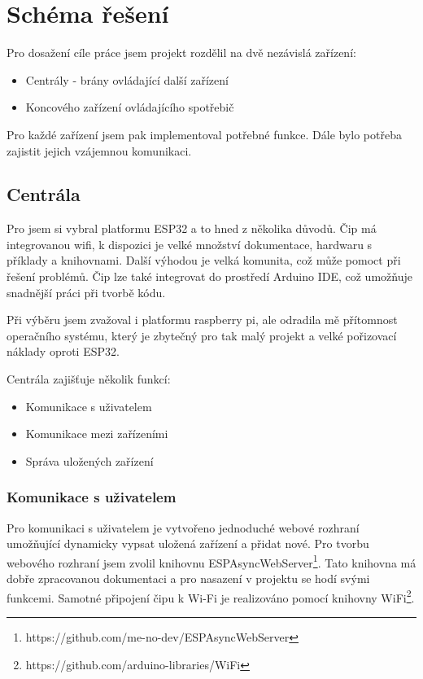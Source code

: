\documentclass[11pt,a4paper,twoside,openright]{report}
\begin{document}
\section{Schéma řešení}

Pro dosažení cíle práce jsem projekt rozdělil na dvě nezávislá zařízení:

\begin{itemize}
	\item Centrály - brány ovládající další zařízení
	\item Koncového zařízení ovládajícího spotřebič
\end{itemize}

Pro každé zařízení jsem pak implementoval potřebné funkce. Dále bylo potřeba zajistit jejich vzájemnou komunikaci.

\subsection{Centrála}

Pro  jsem  si vybral platformu ESP32 a to hned z několika důvodů. Čip má integrovanou wifi, k dispozici je velké množství dokumentace, hardwaru s příklady a knihovnami. Další výhodou je velká komunita, což může pomoct při řešení problémů. Čip lze také integrovat do prostředí Arduino IDE, což umožňuje snadnější práci při tvorbě kódu.


Při výběru jsem zvažoval i platformu raspberry pi, ale odradila mě přítomnost operačního systému, který je zbytečný pro tak malý projekt a velké pořizovací náklady oproti ESP32.

Centrála zajišťuje několik funkcí:
\begin{itemize}
	\item Komunikace s uživatelem
	\item Komunikace mezi zařízeními
	\item Správa uložených zařízení
\end{itemize}

\subsubsection{Komunikace s uživatelem}

Pro komunikaci s uživatelem je vytvořeno jednoduché webové rozhraní umožňující dynamicky vypsat uložená zařízení a přidat nové. Pro tvorbu webového rozhraní jsem zvolil knihovnu ESPAsyncWebServer\footnote{https://github.com/me-no-dev/ESPAsyncWebServer}. Tato knihovna má dobře zpracovanou dokumentaci a pro nasazení v projektu se hodí svými funkcemi. Samotné připojení čipu k Wi-Fi je realizováno pomocí knihovny WiFi\footnote{https://github.com/arduino-libraries/WiFi}.
\end{document}
